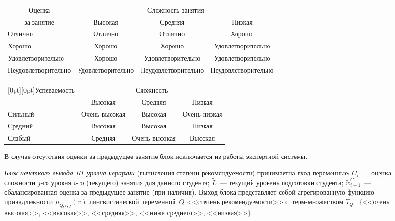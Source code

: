 \begin{multicols}{2}
\begin{table*}
\begin{center}
  \begin{tabular}{|l|c|c|c|}
  \hline
\multicolumn{1}{|c|}{Оценка}&\multicolumn{3}{c|}{Сложность занятия}\\
\cline{2-4}
\multicolumn{1}{|c|}{за занятие}&Высокая&Средняя&Низкая\\
\hline
Отлично&Отлично&Отлично&Хорошо\\
Хорошо&Хорошо&Хорошо&Удовлетворительно\\
Удовлетворительно&Хорошо&Удовлетворительно&Удовлетворительно\\
Неудовлетворительно&Удовлетворительно&Неудовлетворительно& 
Неудовлетворительно\\
\hline
\end{tabular}
\end{center}
\begin{center}
\vspace*{2ex}

\begin{tabular}{|l|c|c|c|} %
\hline
\multicolumn{1}{|c|}{\raisebox{-6pt}[0pt][0pt]{Успеваемость}}&\multicolumn{3}{c|}{Сложность}\\
\cline{2-4}
&Высокая&Средняя&Низкая\\
\hline
Сильный&Очень высокая&Высокая&Очень низкая\\
Средний&Высокая&Высокая&Низкая\\
Слабый&Средняя&Очень высокая&Высокая\\
\hline
\end{tabular}
\end{center}
\vspace*{-3pt}
\end{table*}



 
  В случае отсутствия оценки за предыдущее занятие блок исключается из 
работы экспертной сис\-темы.
  
  \textit{Блок нечеткого вывода III~уровня иерархии} (вычисления 
степени рекомендуемости) принимает\linebreak на вход переменные: $\tilde{C}_i$~--- 
оценка сложности $j$-го уровня $i$-го (текущего) занятия для данного 
студента; $\tilde{L}$~--- текущий уровень подготовки студента; 
$\tilde{w}^C_{i-1}$~--- сбалансированная оценка за предыду\-щее занятие (при 
наличии). Выход блока представляет собой агрегированную функцию 
принадлежности $\mu_{Q,i,j}(x)$ лингвистической переменной~$Q$ <<степень 
рекомендуемости>> с~терм-мно\-же\-ст\-вом $T_Q$\;=\;$\{$<<очень 
высокая>>, <<высокая>>, <<средняя>>, <<ниже среднего>>, <<низкая>>$\}$.
  

\end{multicols}
